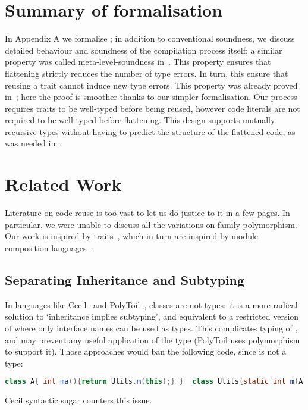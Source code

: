 
\section{Summary of formalisation}

In Appendix A we formalise \name; in addition to conventional soundness, we 
discuss detailed behaviour and soundness
of the compilation process itself;
a similar property was called meta-level-soundness in~\cite{servetto2014meta}.
This property ensures that flattening strictly reduces the number of type errors.
In turn, this
ensure that reusing a trait cannot induce new type errors.
This property was already proved in~\cite{servetto2014meta}; here
the proof is smoother thanks to our simpler formalisation.
Our process requires traits to be well-typed before being reused,
however code literals are not required to be well typed before flattening.
This design supports mutually recursive types without having to
predict the structure of the flattened code, as was
needed in~\cite{deep}.


\section{Related Work}

Literature on code reuse is too vast to let us do justice to it in a few pages.
In particular, we were unable to discuss all the variations on family polymorphism.
Our work is inspired by traits~\cite{ducasse2006traits}, which in turn
are inspired by module composition languages~\cite{ancona_zucca_2002}.

\subsection{Separating Inheritance and Subtyping}
In languages like Cecil~\cite{chambers1995typechecking} and PolyToil~\cite{bruce1995polytoil},
classes are not types: it is a more radical solution to `inheritance implies subtyping', and equivalent to a restricted version of \name where only interface names can be used as types.
This complicates typing of \Q@this@,
and may prevent any useful application of the \Q@This@ type (PolyToil uses polymorphism to support it).
Those approaches would ban the following code,
since \Q@A@ is not a type:
\begin{lstlisting}[language=Java]
class A{ int ma(){return Utils.m(this);} }  class Utils{static int m(A a){..}}
\end{lstlisting}
Cecil syntactic sugar counters this issue. 


